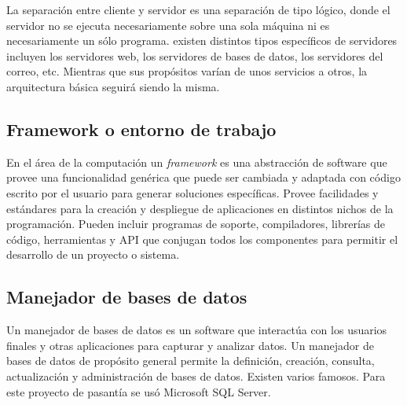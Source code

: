 La separación entre cliente y servidor es una separación de tipo lógico, donde el servidor no se ejecuta necesariamente sobre una sola máquina ni es necesariamente un sólo programa. existen distintos tipos específicos de servidores incluyen los servidores web, los servidores de bases de datos, los servidores del correo, etc. Mientras que sus propósitos varían de unos servicios a otros, la arquitectura básica seguirá siendo la misma\cite{bib:clienteServidor}.

\subsection{Framework o entorno de trabajo} 

En el área de la computación un \emph{framework} es una abstracción de software que provee una funcionalidad genérica que puede ser cambiada y adaptada con código escrito por el usuario para generar soluciones específicas. Provee facilidades y estándares para la creación y despliegue de aplicaciones en distintos nichos de la programación. Pueden incluir programas de soporte, compiladores, librerías de código, herramientas y \gls{API} que conjugan todos los componentes para permitir el desarrollo de un proyecto o sistema\cite{bib:framework}.

\subsection{Manejador de bases de datos} 

Un manejador de bases de datos es un software que interactúa con los usuarios finales y otras aplicaciones para capturar y analizar datos. Un manejador de bases de datos de propósito general permite la definición, creación, consulta, actualización y administración de bases de datos. Existen varios famosos. Para este proyecto de pasantía se usó Microsoft \gls{SQL} Server.